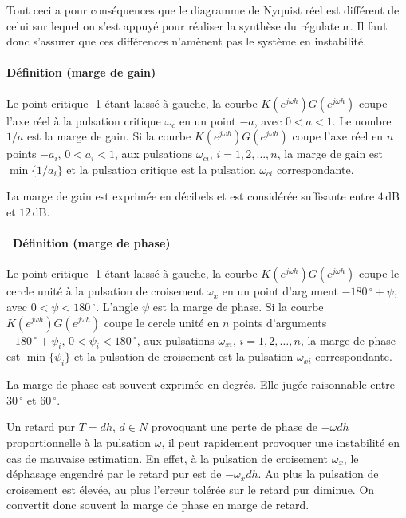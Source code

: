 \documentclass[11pt]{article}
\begin{document}
    Tout ceci a pour conséquences que le diagramme de Nyquist réel est
différent de celui sur lequel on s'est appuyé pour réaliser la synthèse
du régulateur. Il faut donc s'assurer que ces différences n'amènent pas
le système en instabilité.

    \paragraph{Définition (marge de
gain)}\label{duxe9finition-marge-de-gain}

Le point critique -1 étant laissé à gauche, la courbe
\(K(e^{j\omega h})G(e^{j\omega h})\) coupe l'axe réel à la pulsation
critique \(\omega_c\) en un point \(-a\), avec \(0 < a < 1\). Le nombre
\(1/a\) est la marge de gain. Si la courbe
\(K(e^{j\omega h})G(e^{j\omega h})\) coupe l'axe réel en \(n\) points
\(-a_i, \, 0 < a_i < 1\), aux pulsations
\(\omega_{ci}, \, i = 1, 2, \dots, n\), la marge de gain est
\(\min\{1/a_i\}\) et la pulsation critique est la pulsation
\(\omega_{ci}\) correspondante.

    La marge de gain est exprimée en décibels et est considérée suffisante
entre \(4\,\mathrm{dB}\) et \(12\,\mathrm{dB}\).

    \paragraph{~Définition (marge de
phase)}\label{duxe9finition-marge-de-phase}

Le point critique -1 étant laissé à gauche, la courbe
\(K(e^{j\omega h})G(e^{j\omega h})\) coupe le cercle unité à la
pulsation de croisement \(\omega_x\) en un point d'argument
\(-180\,^{\circ}+\psi\), avec \(0 < \psi < 180\,^{\circ}\). L'angle
\(\psi\) est la marge de phase. Si la courbe
\(K(e^{j\omega h})G(e^{j\omega h})\) coupe le cercle unité en \(n\)
points d'arguments
\(-180\,^{\circ}+\psi_i, \, 0 < \psi_i < 180\,^{\circ}\), aux pulsations
\(\omega_{xi}, \, i = 1, 2, \dots, n\), la marge de phase est
\(\min\{\psi_i\}\) et la pulsation de croisement est la pulsation
\(\omega_{xi}\) correspondante.

    La marge de phase est souvent exprimée en degrés. Elle jugée raisonnable
entre \(30\,^{\circ}\) et \(60\,^{\circ}\).

    Un retard pur \(T = dh, \, d \in N\) provoquant une perte de phase de
\(-\omega dh\) proportionnelle à la pulsation \(\omega\), il peut
rapidement provoquer une instabilité en cas de mauvaise estimation. En
effet, à la pulsation de croisement \(\omega_x\), le déphasage engendré
par le retard pur est de \(-\omega_x dh\). Au plus la pulsation de
croisement est élevée, au plus l'erreur tolérée sur le retard pur
diminue. On convertit donc souvent la marge de phase en marge de retard.
\end{document}
